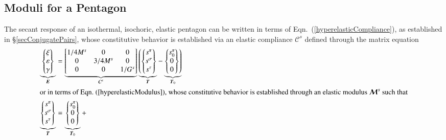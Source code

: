 \subsection{Moduli for a Pentagon}

The secant response of an isothermal, isochoric, elastic pentagon can be written in terms of Eqn.~(\ref{hyperelasticCompliance}), as established in \S\ref{secConjugatePairs}, whose constitutive behavior is established via an elastic compliance $\boldsymbol{\mathcal{C}}^s$ defined through the matrix equation
\begin{subequations}
    \label{pentagonCEs}
    \begin{align}
    \underbrace{ \left\{ \begin{matrix} 
        \xi \\ \varepsilon \\ \gamma \end{matrix} 
    \right\} }_{\boldsymbol{E}} & =
    \underbrace{ \begin{bmatrix} 
        1/4M^s & 0 & 0 \\ 0 & 3/4M^s & 0 \\ 0 & 0 & 1/G^s 
    \end{bmatrix} }_{\boldsymbol{\mathcal{C}}^s} 
    \underbrace{ \left( \left\{ \begin{matrix}
        s^{\pi} \\ s^{\sigma} \\ s^{\tau}
    \end{matrix} \right\} \right. }_{\boldsymbol{T}} - 
    \underbrace{ \left. \left\{ \begin{matrix}
    s^{\pi}_0 \\ 0 \\ 0
    \end{matrix} \right\} \right) }_{\boldsymbol{T}_0} 
    \label{pentagonSecantCompliance} \\
    \intertext{or in terms of Eqn.~(\ref{hyperelasticModulus}), whose constitutive behavior is established through an elastic modulus $\boldsymbol{\mathcal{M}}^s$ such that}
    \underbrace{ \left\{ \begin{matrix}
    s^{\pi} \\ s^{\sigma} \\ s^{\tau}
    \end{matrix} \right\} }_{\boldsymbol{T}}  & =
    \underbrace{ \left\{ \begin{matrix}
    s^{\pi}_0 \\ 0 \\ 0
    \end{matrix} \right\} }_{\boldsymbol{T}_0} +

\end{align}
\end{subequations}
